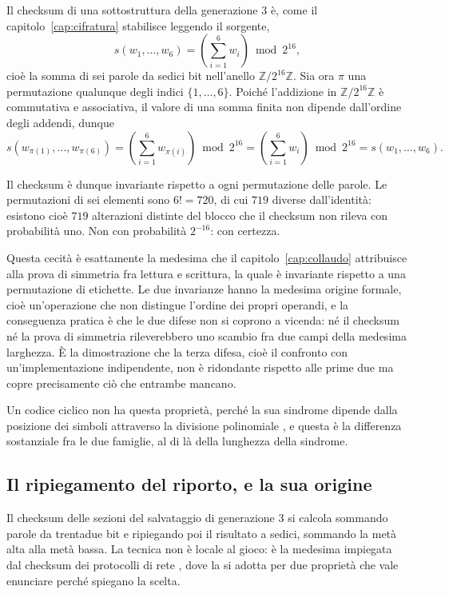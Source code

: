 Il checksum di una sottostruttura della generazione 3 è, come il capitolo~\ref{cap:cifratura} stabilisce leggendo il sorgente,
\[
s(w_1, \dots, w_6) = \left(\sum_{i=1}^{6} w_i\right) \bmod 2^{16},
\]
cioè la somma di sei parole da sedici bit nell'anello $\mathbb{Z}/2^{16}\mathbb{Z}$. Sia ora $\pi$ una permutazione qualunque degli indici $\{1, \dots, 6\}$. Poiché l'addizione in $\mathbb{Z}/2^{16}\mathbb{Z}$ è commutativa e associativa, il valore di una somma finita non dipende dall'ordine degli addendi, dunque
\[
s(w_{\pi(1)}, \dots, w_{\pi(6)}) = \left(\sum_{i=1}^{6} w_{\pi(i)}\right) \bmod 2^{16}
= \left(\sum_{i=1}^{6} w_i\right) \bmod 2^{16} = s(w_1, \dots, w_6).
\]

Il checksum è dunque invariante rispetto a ogni permutazione delle parole. Le permutazioni di sei elementi sono $6! = 720$, di cui $719$ diverse dall'identità: esistono cioè $719$ alterazioni distinte del blocco che il checksum non rileva con probabilità uno. Non con probabilità $2^{-16}$: con certezza.

Questa cecità è esattamente la medesima che il capitolo~\ref{cap:collaudo} attribuisce alla prova di simmetria fra lettura e scrittura, la quale è invariante rispetto a una permutazione di etichette. Le due invarianze hanno la medesima origine formale, cioè un'operazione che non distingue l'ordine dei propri operandi, e la conseguenza pratica è che le due difese non si coprono a vicenda: né il checksum né la prova di simmetria rileverebbero uno scambio fra due campi della medesima larghezza. È la dimostrazione che la terza difesa, cioè il confronto con un'implementazione indipendente, non è ridondante rispetto alle prime due ma copre precisamente ciò che entrambe mancano.

Un codice ciclico non ha questa proprietà, perché la sua sindrome dipende dalla posizione dei simboli attraverso la divisione polinomiale \cite{peterson-brown}, e questa è la differenza sostanziale fra le due famiglie, al di là della lunghezza della sindrome.

\subsection{Il ripiegamento del riporto, e la sua origine}

Il checksum delle sezioni del salvataggio di generazione 3 si calcola sommando parole da trentadue bit e ripiegando poi il risultato a sedici, sommando la metà alta alla metà bassa. La tecnica non è locale al gioco: è la medesima impiegata dal checksum dei protocolli di rete \cite{rfc1071}, dove la si adotta per due proprietà che vale enunciare perché spiegano la scelta.


